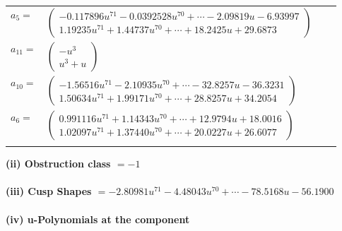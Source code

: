 \documentclass[1p]{elsarticle_modified}
\theoremstyle{definition}
\begin{document}
\begin{tabular}{m{7pt} m{180pt} m{7pt} m{180pt} }
\flushright $a_{5}=$&$\begin{pmatrix}-0.117896 u^{71}-0.0392528 u^{70}+\cdots-2.09819 u-6.93997\\1.19235 u^{71}+1.44737 u^{70}+\cdots+18.2425 u+29.6873\end{pmatrix}$ \\
\flushright $a_{11}=$&$\begin{pmatrix}- u^3\\u^3+u\end{pmatrix}$ \\
\flushright $a_{10}=$&$\begin{pmatrix}-1.56516 u^{71}-2.10935 u^{70}+\cdots-32.8257 u-36.3231\\1.50634 u^{71}+1.99171 u^{70}+\cdots+28.8257 u+34.2054\end{pmatrix}$ \\
\flushright $a_{6}=$&$\begin{pmatrix}0.991116 u^{71}+1.14343 u^{70}+\cdots+12.9794 u+18.0016\\1.02097 u^{71}+1.37440 u^{70}+\cdots+20.0227 u+26.6077\end{pmatrix}$\\&\end{tabular}
\flushleft \textbf{(ii) Obstruction class $= -1$}\\~\\
\flushleft \textbf{(iii) Cusp Shapes $= -2.80981 u^{71}-4.48043 u^{70}+\cdots-78.5168 u-56.1900$}\\~\\
\newpage\renewcommand{\arraystretch}{1}
\flushleft \textbf{(iv) u-Polynomials at the component}\newline \\
\end{document}

